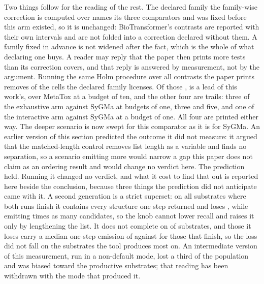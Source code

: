 \documentclass[journal=jcisd8,manuscript=suppinfo,layout=onecolumn]{achemso}
\begin{document}
Two things follow for the reading of the rest. The declared family the family-wise correction is
computed over names its three comparators and was fixed before this arm existed, so it is
unchanged: BioTransformer's contrasts are reported with their own intervals and are not folded
into a correction declared without them. A family fixed in advance is not widened after the fact,
which is the whole of what declaring one buys. A reader may reply that the paper then prints more
tests than its correction covers, and that reply is answered by measurement, not by the argument.
Running the same Holm procedure over all \numHolmWidetests{} contrasts the paper prints removes
\numHolmWideremovesWord{} of the cells the declared family licenses. Of those \numHolmWideremovesWord{},
\numHolmWideleadsremovedWord{} is a lead of this work's, over MetaTox at a budget of ten, and the other
four are trails: three of the exhaustive arm against SyGMa at budgets of one, three and five, and
one of the interactive arm against SyGMa at a budget of one. All four are printed either way. The deeper scenario is now swept for this comparator as it is for SyGMa. An earlier version of
this section predicted the outcome it did not measure: it argued that the matched-length
control removes list length as a variable and finds no separation, so a scenario emitting more
would narrow a gap this paper does not claim as an ordering result and would change no verdict
here. The prediction held. Running it changed no verdict, and what it cost to find that out is
reported here beside the conclusion, because three things the prediction did not
anticipate came with it. A second generation is a strict superset: on all \numBtstepsPaired{}
substrates where both runs finish it contains every structure one step returned and loses
\numBtstepsLostgenoneWord{}, while emitting \numBtstepsRatio{} times as many candidates, so the knob
cannot lower recall and raises it only by lengthening the list. It does not complete on
\numBtstepsLost{} of \numBtstepsAttempted{} substrates, and those it loses carry a median
one-step emission of \numBtstepsLostmedian{} against \numBtstepsKeptmedian{} for those that
finish, so the loss did not fall on the substrates the tool produces most on. An intermediate
version of this measurement, run in a non-default mode, lost a third of the population and was
biased toward the productive substrates; that reading has been withdrawn with the mode that
produced it.
\end{document}
